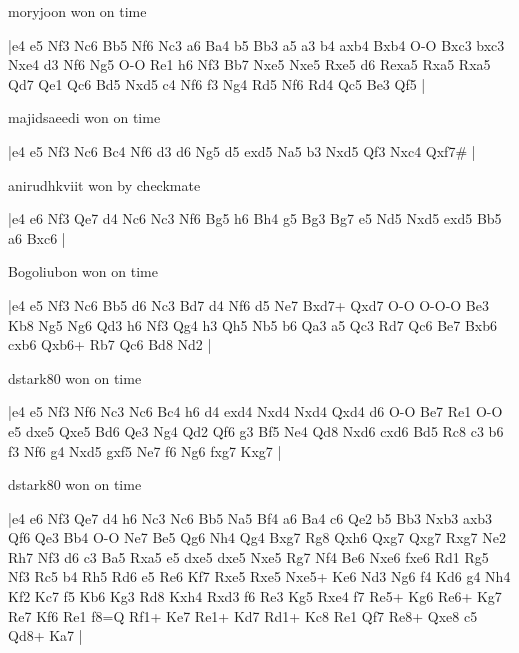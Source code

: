 \showboard

moryjoon won on time

\makegametitle
|e4 e5 Nf3 Nc6 Bb5 Nf6 Nc3 a6 Ba4 b5 Bb3 a5 a3 b4 axb4 Bxb4 O-O Bxc3 bxc3 Nxe4 d3 Nf6 Ng5 O-O Re1 h6 Nf3 Bb7 Nxe5 Nxe5 Rxe5 d6 Rexa5 Rxa5 Rxa5 Qd7 Qe1 Qc6 Bd5 Nxd5 c4 Nf6 f3 Ng4 Rd5 Nf6 Rd4 Qc5 Be3 Qf5  |

\showboard

majidsaeedi won on time

\makegametitle
|e4 e5 Nf3 Nc6 Bc4 Nf6 d3 d6 Ng5 d5 exd5 Na5 b3 Nxd5 Qf3 Nxc4 Qxf7\#  |

\showboard

anirudhkviit won by checkmate

\makegametitle
|e4 e6 Nf3 Qe7 d4 Nc6 Nc3 Nf6 Bg5 h6 Bh4 g5 Bg3 Bg7 e5 Nd5 Nxd5 exd5 Bb5 a6 Bxc6  |

\showboard

Bogoliubon won on time

\makegametitle
|e4 e5 Nf3 Nc6 Bb5 d6 Nc3 Bd7 d4 Nf6 d5 Ne7 Bxd7+ Qxd7 O-O O-O-O Be3 Kb8 Ng5 Ng6 Qd3 h6 Nf3 Qg4 h3 Qh5 Nb5 b6 Qa3 a5 Qc3 Rd7 Qc6 Be7 Bxb6 cxb6 Qxb6+ Rb7 Qc6 Bd8 Nd2  |

\showboard

dstark80 won on time

\makegametitle
|e4 e5 Nf3 Nf6 Nc3 Nc6 Bc4 h6 d4 exd4 Nxd4 Nxd4 Qxd4 d6 O-O Be7 Re1 O-O e5 dxe5 Qxe5 Bd6 Qe3 Ng4 Qd2 Qf6 g3 Bf5 Ne4 Qd8 Nxd6 cxd6 Bd5 Rc8 c3 b6 f3 Nf6 g4 Nxd5 gxf5 Ne7 f6 Ng6 fxg7 Kxg7  |

\showboard

dstark80 won on time

\makegametitle
|e4 e6 Nf3 Qe7 d4 h6 Nc3 Nc6 Bb5 Na5 Bf4 a6 Ba4 c6 Qe2 b5 Bb3 Nxb3 axb3 Qf6 Qe3 Bb4 O-O Ne7 Be5 Qg6 Nh4 Qg4 Bxg7 Rg8 Qxh6 Qxg7 Qxg7 Rxg7 Ne2 Rh7 Nf3 d6 c3 Ba5 Rxa5 e5 dxe5 dxe5 Nxe5 Rg7 Nf4 Be6 Nxe6 fxe6 Rd1 Rg5 Nf3 Rc5 b4 Rh5 Rd6 e5 Re6 Kf7 Rxe5 Rxe5 Nxe5+ Ke6 Nd3 Ng6 f4 Kd6 g4 Nh4 Kf2 Kc7 f5 Kb6 Kg3 Rd8 Kxh4 Rxd3 f6 Re3 Kg5 Rxe4 f7 Re5+ Kg6 Re6+ Kg7 Re7 Kf6 Re1 f8=Q Rf1+ Ke7 Re1+ Kd7 Rd1+ Kc8 Re1 Qf7 Re8+ Qxe8 c5 Qd8+ Ka7  |

